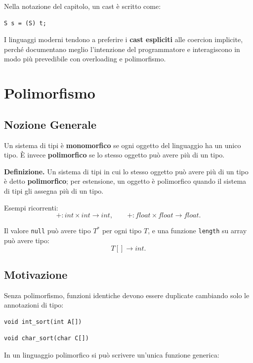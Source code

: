 \documentclass{article}
\begin{document}
Nella notazione del capitolo, un cast è scritto come:

\begin{lstlisting}
S s = (S) t;
\end{lstlisting}

I linguaggi moderni tendono a preferire i \textbf{cast espliciti} alle coercion implicite, perché documentano meglio l'intenzione del programmatore e interagiscono in modo più prevedibile con overloading e polimorfismo.

\section{Polimorfismo}

\subsection{Nozione Generale}

Un sistema di tipi è \textbf{monomorfico} se ogni oggetto del linguaggio ha un unico tipo. È invece \textbf{polimorfico} se lo stesso oggetto può avere più di un tipo.

\textbf{Definizione.} Un sistema di tipi in cui lo stesso oggetto può avere più di un tipo è detto \textbf{polimorfico}; per estensione, un oggetto è polimorfico quando il sistema di tipi gli assegna più di un tipo.

Esempi ricorrenti:
\[
+ : int \times int \to int,
\qquad
+ : float \times float \to float.
\]

Il valore \texttt{null} può avere tipo $T^*$ per ogni tipo $T$, e una funzione \texttt{length} su array può avere tipo:
\[
T[] \to int.
\]

\subsection{Motivazione}

Senza polimorfismo, funzioni identiche devono essere duplicate cambiando solo le annotazioni di tipo:

\begin{lstlisting}
void int_sort(int A[])
\end{lstlisting}

\begin{lstlisting}
void char_sort(char C[])
\end{lstlisting}

In un linguaggio polimorfico si può scrivere un'unica funzione generica:
\end{document}
